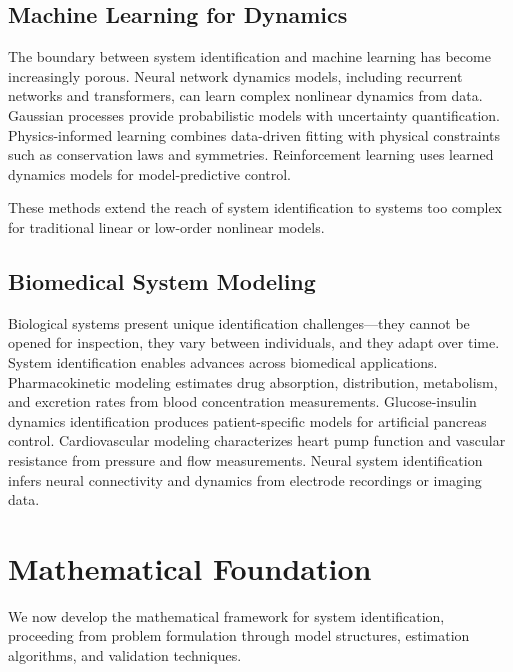 \subsection{Machine Learning for Dynamics}
\label{subsec:ml}

The boundary between system identification and machine learning has become increasingly porous. Neural network dynamics models, including recurrent networks and transformers, can learn complex nonlinear dynamics from data. Gaussian processes provide probabilistic models with uncertainty quantification. Physics-informed learning combines data-driven fitting with physical constraints such as conservation laws and symmetries. Reinforcement learning uses learned dynamics models for model-predictive control.

These methods extend the reach of system identification to systems too complex for traditional linear or low-order nonlinear models.

\subsection{Biomedical System Modeling}
\label{subsec:biomedical}

Biological systems present unique identification challenges---they cannot be opened for inspection, they vary between individuals, and they adapt over time. System identification enables advances across biomedical applications. Pharmacokinetic modeling estimates drug absorption, distribution, metabolism, and excretion rates from blood concentration measurements. Glucose-insulin dynamics identification produces patient-specific models for artificial pancreas control. Cardiovascular modeling characterizes heart pump function and vascular resistance from pressure and flow measurements. Neural system identification infers neural connectivity and dynamics from electrode recordings or imaging data.

\section{Mathematical Foundation}
\label{sec:sysid_math}

We now develop the mathematical framework for system identification, proceeding from problem formulation through model structures, estimation algorithms, and validation techniques.

